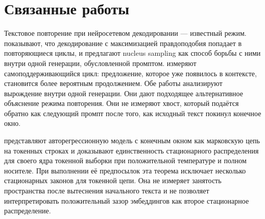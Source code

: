 \documentclass[10pt]{article}
\begin{document}
\section{Связанные работы}
\label{sec:related}

Текстовое повторение при нейросетевом декодировании --- известный режим.
\citet{holtzman2020} показывают, что декодирование с максимизацией
правдоподобия попадает в повторяющиеся циклы, и предлагают nucleus sampling
как способ борьбы с ними внутри одной генерации, обусловленной промптом.
\citet{xu2022} измеряют самоподдерживающийся цикл: предложение,
которое уже появилось в контексте, становится более вероятным продолжением.
Обе работы анализируют вырождение внутри одной генерации.
Они дают подходящее альтернативное объяснение режима повторения.
Они не измеряют хвост, который подаётся обратно как следующий промпт
после того, как исходный текст покинул конечное окно.

\citet{zekri2024} представляют авторегрессионную модель с конечным окном
как марковскую цепь на токенных строках и доказывают единственность
стационарного распределения для своего ядра токенной выборки
при положительной температуре и полном носителе.
При выполнении её предпосылок эта теорема исключает несколько
стационарных законов для токенной цепи.
Она не измеряет занятость пространства после вытеснения начального текста
и не позволяет интерпретировать положительный зазор эмбеддингов
как второе стационарное распределение.
\end{document}
